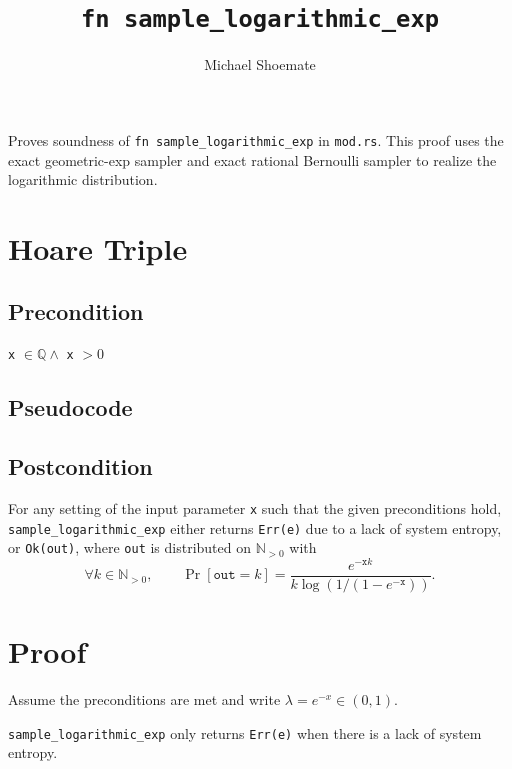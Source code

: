 \documentclass{article}
\title{\texttt{fn sample\_logarithmic\_exp}}
\author{Michael Shoemate}
\begin{document}
\maketitle

\contrib Proves soundness of \texttt{fn sample\_logarithmic\_exp} in \texttt{mod.rs}.
This proof uses the exact geometric-exp sampler and exact rational Bernoulli sampler
to realize the logarithmic distribution.

\section{Hoare Triple}

\subsection*{Precondition}
\texttt{x} $\in \mathbb{Q} \land$ \texttt{x} $> 0$

\subsection*{Pseudocode}


\subsection*{Postcondition}
\begin{theorem}
\label{postcondition}
For any setting of the input parameter \texttt{x} such that the given preconditions hold, \\
\texttt{sample\_logarithmic\_exp} either returns \texttt{Err(e)} due to a lack of system entropy,
or \texttt{Ok(out)}, where \texttt{out} is distributed on $\mathbb{N}_{>0}$ with
\[
\forall k \in \mathbb{N}_{>0}, \qquad
\Pr[\texttt{out} = k]
=
\frac{e^{-\texttt{x}k}}{k \log(1 / (1 - e^{-\texttt{x}}))}.
\]
\end{theorem}

\section{Proof}

Assume the preconditions are met and write $\lambda = e^{-x} \in (0, 1)$.

\begin{lemma}
\label{err-e}
\texttt{sample\_logarithmic\_exp} only returns \texttt{Err(e)} when there is a lack of system entropy.
\end{lemma}
\end{document}
